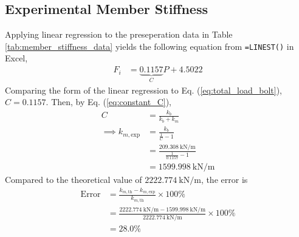 \subsection{Experimental Member Stiffness}
Applying linear regression to the preseperation data in Table \ref{tab:member_stiffness_data} yields the following equation from \texttt{=LINEST()} in Excel,
\begin{align*}
    F_i &= \underbrace{0.1157}_{C} P + 4.5022
\end{align*}
Comparing the form of the linear regression to Eq. (\ref{eq:total_load_bolt}), $C = 0.1157$. Then, by Eq. (\ref{eq:constant_C}), 
\begin{align*}
    C &= \frac{k_b}{k_b + k_m} \\
    \implies k_{m, \text{exp}} &= \frac{k_b}{\frac{1}{C} - 1} \\
    &= \frac{\qty{209.308}{\kilo\newton\per\meter}}{\frac{1}{0.1157} - 1} \\
    &= \boxed{\qty{1599.998}{\kilo\newton\per\meter}}
\end{align*}
Compared to the theoretical value of $\qty{2222.774}{\kilo\newton\per\meter}$, the error is
\begin{align*}
    \text{Error} &= \frac{k_{m, \text{th}} - k_{m, \text{exp}}}{k_{m, \text{th}}} \times 100\% \\
    &= \frac{\qty{2222.774}{\kilo\newton\per\meter} - \qty{1599.998}{\kilo\newton\per\meter}}{\qty{2222.774}{\kilo\newton\per\meter}} \times 100\% \\
    &= \boxed{28.0\%}
\end{align*}
